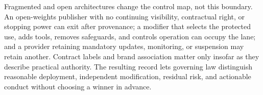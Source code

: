 Fragmented and open architectures change the control map, not this boundary. An open-weights publisher with no continuing visibility, contractual right, or stopping power can exit after provenance; a modifier that selects the protected use, adds tools, removes safeguards, and controls operation can occupy the lane; and a provider retaining mandatory updates, monitoring, or suspension may retain another. Contract labels and brand association matter only insofar as they describe practical authority. The resulting record lets governing law distinguish reasonable deployment, independent modification, residual risk, and actionable conduct without choosing a winner in advance.
